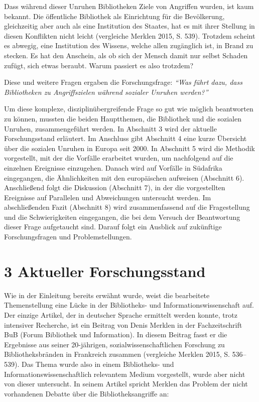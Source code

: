 \documentclass[a4paper,
fontsize=11pt,
oneside,
numbers=noperiodatend,
parskip=half-,
bibliography=totoc,
final
]{scrartcl}
\begin{document}
Dass während dieser Unruhen Bibliotheken Ziele von Angriffen wurden, ist
kaum bekannt. Die öffentliche Bibliothek als Einrichtung für die
Bevölkerung, gleichzeitig aber auch als eine Institution des Staates,
hat es mit ihrer Stellung in diesen Konflikten nicht leicht (vergleiche
Merklen 2015, S. 539). Trotzdem scheint es abwegig, eine Institution des
Wissens, welche allen zugänglich ist, in Brand zu stecken. Es hat den
Anschein, als ob sich der Mensch damit nur selbst Schaden zufügt, sich
etwas beraubt. Warum passiert es also trotzdem?

Diese und weitere Fragen ergaben die Forschungsfrage: \emph{\enquote{Was
führt dazu, dass Bibliotheken zu Angriffszielen während sozialer Unruhen
werden?}}

Um diese komplexe, disziplinübergreifende Frage so gut wie möglich
beantworten zu können, mussten die beiden Hauptthemen, die Bibliothek
und die sozialen Unruhen, zusammengeführt werden. In Abschnitt 3 wird
der aktuelle Forschungsstand erläutert. Im Anschluss gibt Abschnitt 4
eine kurze Übersicht über die sozialen Unruhen in Europa seit 2000. In
Abschnitt 5 wird die Methodik vorgestellt, mit der die Vorfälle
erarbeitet wurden, um nachfolgend auf die einzelnen Ereignisse
einzugehen. Danach wird auf Vorfälle in Südafrika eingegangen, die
Ähnlichkeiten mit den europäischen aufweisen (Abschnitt 6). Anschließend
folgt die Diskussion (Abschnitt 7), in der die vorgestellten Ereignisse
auf Parallelen und Abweichungen untersucht werden. Im abschließenden
Fazit (Abschnitt 8) wird zusammenfassend auf die Fragestellung und die
Schwierigkeiten eingegangen, die bei dem Versuch der Beantwortung dieser
Frage aufgetaucht sind. Darauf folgt ein Ausblick auf zukünftige
Forschungsfragen und Problemstellungen.

\hypertarget{aktueller-forschungsstand}{%
\section{3 Aktueller
Forschungsstand}\label{aktueller-forschungsstand}}

Wie in der Einleitung bereits erwähnt wurde, weist die bearbeitete
Themenstellung eine Lücke in der Bibliotheks- und
Informationswissenschaft auf. Der einzige Artikel, der in deutscher
Sprache ermittelt werden konnte, trotz intensiver Recherche, ist ein
Beitrag von Denis Merklen in der Fachzeitschrift BuB (Forum Bibliothek
und Information). In diesem Beitrag fasst er die Ergebnisse aus seiner
20-jährigen, sozialwissenschaftlichen Forschung zu Bibliotheksbränden in
Frankreich zusammen (vergleiche Merklen 2015, S. 536--539). Das Thema
wurde also in einem Bibliotheks- und Informationswissenschaftlich
relevantem Medium vorgestellt, wurde aber nicht von dieser untersucht.
In seinem Artikel spricht Merklen das Problem der nicht vorhandenen
Debatte über die Bibliotheksangriffe an:
\end{document}
